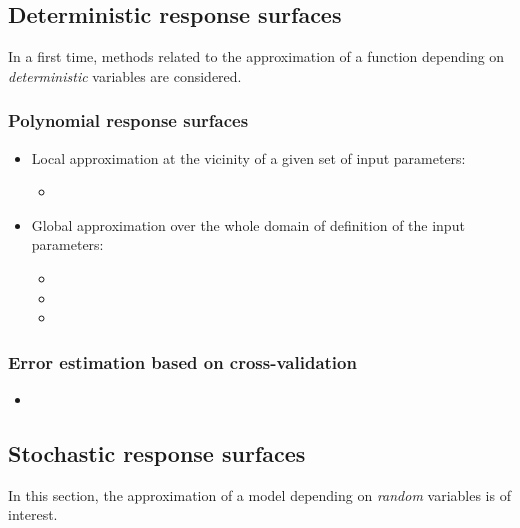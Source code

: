 \subsection{Deterministic response surfaces}

In a first time, methods related to the approximation of a function depending on \emph{deterministic} variables are considered.

\subsubsection{Polynomial response surfaces}


\begin{itemize}
\item Local approximation at the vicinity of a given set of input parameters:
\begin{itemize}
  \item {}
\end{itemize}
\item Global approximation over the whole domain of definition of the input parameters:
\begin{itemize}
  \item {}
  \item {}
  \item {}
\end{itemize}
\end{itemize}

\subsubsection{Error estimation based on cross-validation}
\begin{itemize}
  \item {}
\end{itemize}

\subsection{Stochastic response surfaces}

In this section, the approximation of a model depending on \emph{random} variables is of interest.


